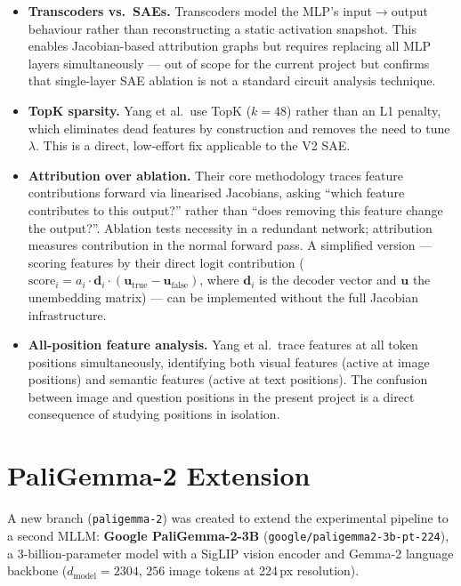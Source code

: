 \documentclass[11pt,a4paper]{article}
\begin{document}
\begin{itemize}[noitemsep]
  \item \textbf{Transcoders vs.\ SAEs.} Transcoders model the MLP's input$\to$output behaviour
    rather than reconstructing a static activation snapshot. This enables Jacobian-based
    attribution graphs but requires replacing all MLP layers simultaneously — out of scope for
    the current project but confirms that single-layer SAE ablation is not a standard circuit
    analysis technique.

  \item \textbf{TopK sparsity.} Yang et al.\ use TopK ($k = 48$) rather than an L1 penalty,
    which eliminates dead features by construction and removes the need to tune $\lambda$.
    This is a direct, low-effort fix applicable to the V2 SAE.

  \item \textbf{Attribution over ablation.} Their core methodology traces feature contributions
    forward via linearised Jacobians, asking ``which feature contributes to this output?'' rather
    than ``does removing this feature change the output?''. Ablation tests necessity in a
    redundant network; attribution measures contribution in the normal forward pass.
    A simplified version — scoring features by their direct logit contribution
    ($\text{score}_i = a_i \cdot \mathbf{d}_i \cdot (\mathbf{u}_{\text{true}} -
    \mathbf{u}_{\text{false}})$, where $\mathbf{d}_i$ is the decoder vector and
    $\mathbf{u}$ the unembedding matrix) — can be implemented without the full Jacobian
    infrastructure.

  \item \textbf{All-position feature analysis.} Yang et al.\ trace features at all token
    positions simultaneously, identifying both visual features (active at image positions)
    and semantic features (active at text positions). The confusion between image and question
    positions in the present project is a direct consequence of studying positions in isolation.
\end{itemize}

\section{PaliGemma-2 Extension}
\label{sec:paligemma}

A new branch (\texttt{paligemma-2}) was created to extend the experimental pipeline to a second
MLLM: \textbf{Google PaliGemma-2-3B} (\texttt{google/paligemma2-3b-pt-224}),
a 3-billion-parameter model with a SigLIP vision encoder and Gemma-2 language backbone
($d_{\mathrm{model}} = 2304$, $256$ image tokens at 224\,px resolution).
\end{document}
